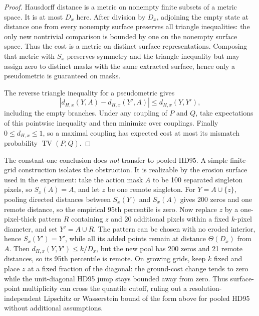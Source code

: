\begin{proof}
Hausdorff distance is a metric on nonempty finite subsets of a metric space.
It is at most $D_x$ here. After division by $D_x$, adjoining the empty state at
distance one from every nonempty surface preserves all triangle inequalities:
the only new nontrivial comparison is bounded by one on the nonempty surface
space. Thus the cost is a metric on distinct surface representations. Composing
that metric with $S_x$ preserves symmetry and the triangle inequality but may
assign zero to distinct masks with the same extracted surface, hence only a
pseudometric is guaranteed on masks.

The reverse triangle inequality for a pseudometric gives
\begin{equation*}
  |d_{H,x}(Y,A)-d_{H,x}(Y',A)|\leq d_{H,x}(Y,Y'),
\end{equation*}
including the empty branches. Under any coupling of $P$ and $Q$, take
expectations of this pointwise inequality and then minimize over couplings.
Finally $0\leq d_{H,x}\leq1$, so a maximal coupling has expected cost at most
its mismatch probability $\operatorname{TV}(P,Q)$.
\end{proof}

\begin{remark}
\label{app:rem:hd95-nonmetric}
The constant-one conclusion does \emph{not} transfer to pooled HD95. A simple
finite-grid construction isolates the obstruction. It is realizable by the
erosion surface used in the experiment: take the action mask $A$ to be 100
separated singleton pixels, so $S_x(A)=A$, and let $z$ be one remote singleton.
For $Y=A\cup\{z\}$, pooling directed distances between $S_x(Y)$ and $S_x(A)$
gives 200 zeros and one remote distance, so the empirical 95th percentile is
zero. Now replace $z$ by a one-pixel-thick pattern $R$ containing $z$ and 20
additional pixels within a fixed $k$-pixel diameter, and set $Y'=A\cup R$.
The pattern can be chosen with no eroded interior, hence $S_x(Y')=Y'$, while
all its added points remain at distance $\Theta(D_x)$ from $A$. Then
$d_{H,x}(Y,Y')\leq k/D_x$, but the new pool has 200 zeros and 21 remote
distances, so its 95th percentile is remote. On growing grids, keep $k$ fixed
and place $z$ at a fixed fraction of the diagonal: the ground-cost change tends
to zero while the unit-diagonal HD95 jump stays bounded away from zero. Thus
surface-point multiplicity can cross the quantile cutoff, ruling out a
resolution-independent Lipschitz or Wasserstein bound of the form above for
pooled HD95 without additional assumptions.
\end{remark}

